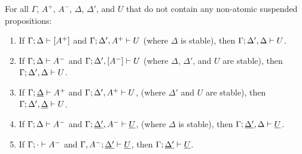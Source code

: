 \bigskip
\begin{theorem}\label{thm:lincut}
For all $\Gamma$, $A^+$, $A^-$, $\Delta$, $\Delta'$, and $U$ that
do not contain any non-atomic suspended propositions:
\begin{enumerate}
\item If ${\Gamma};{\Delta} \vdash {[A^+]} \mathstrut$
      and ${\Gamma};{\Delta',A^+} \vdash {U} \mathstrut$
      (where $\Delta$ is stable), 
      then ${\Gamma};{\Delta',\Delta} \vdash {U} \mathstrut$.
\item If ${\Gamma};{\Delta} \vdash {A^-} \mathstrut$
      and ${\Gamma};{\Delta', [A^-]} \vdash {U} \mathstrut$
      (where $\Delta$, $\Delta'$, and $U$ are stable),
      then ${\Gamma};{\Delta',\Delta} \vdash {U} \mathstrut$. 
\item If ${\Gamma};{\underline{\Delta}} \vdash {A^+} \mathstrut$
      and ${\Gamma};{\Delta', A^+} \vdash {U} \mathstrut$,
      (where $\Delta'$ and $U$ are stable),
      then ${\Gamma};{\Delta',\underline{\Delta}} \vdash {U} \mathstrut$. 
\item If ${\Gamma};{\Delta} \vdash {A^-} \mathstrut$
      and ${\Gamma};{\underline{\Delta'}, A^-} \vdash {\underline{U}} \mathstrut$,
      (where $\Delta$ is stable),
      then ${\Gamma};{\underline{\Delta'},\Delta} \vdash {\underline{U}} \mathstrut$. 
\item If ${\Gamma};{\cdot} \vdash {A^-} \mathstrut$
      and ${\Gamma, A^-};{\underline{\Delta'}} \vdash {\underline{U}} \mathstrut$,
      then ${\Gamma};{\underline{\Delta'}} \vdash {\underline{U}} \mathstrut$. 
\end{enumerate}
\end{theorem}

